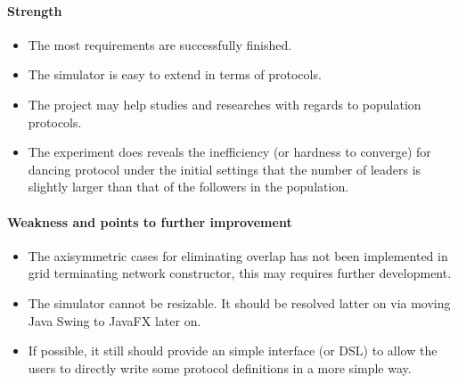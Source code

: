 \paragraph{Strength}
\begin{itemize}
  \item The most requirements are successfully finished.
  \item The simulator is easy to extend in terms of protocols.
  \item The project may help studies and researches with regards to population protocols.
  \item The experiment does reveals the inefficiency (or hardness to converge) for dancing protocol under the initial settings that the number of leaders is slightly larger than that of the followers in the population.
\end{itemize}
\paragraph{Weakness and points to further improvement}
\begin{itemize}
  \item The axisymmetric cases for eliminating overlap has not been implemented in grid terminating network constructor,
  this may requires further development.
  \item The simulator cannot be resizable. It should be resolved latter on via moving Java Swing to JavaFX later on.
  \item If possible, it still should provide an simple interface (or DSL) to allow the users to directly write some protocol definitions in a more simple way.
\end{itemize}
